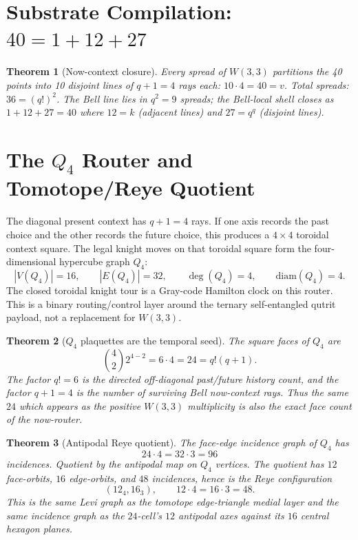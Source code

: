 \documentclass[11pt]{article}
\newtheorem{theorem}{Theorem}
\begin{document}
\section{Substrate Compilation: $40 = 1 + 12 + 27$}

\begin{theorem}[Now-context closure]\label{thm:nowclosure}
Every spread of $W(3,3)$ partitions the 40 points into 10 disjoint lines
of $q+1=4$ rays each: $10\cdot 4 = 40 = v$.  Total spreads: $36 = (q!)^2$.
The Bell line lies in $q^2 = 9$ spreads; the Bell-local shell closes as
$1 + 12 + 27 = 40$ where $12 = k$ (adjacent lines) and $27 = q^q$
(disjoint lines).
\end{theorem}

\section{The $Q_4$ Router and Tomotope/Reye Quotient}

The diagonal present context has $q+1=4$ rays.  If one axis records the
past choice and the other records the future choice, this produces a
$4\times4$ toroidal context square.  The legal knight moves on that
toroidal square form the four-dimensional hypercube graph $Q_4$:
\[
  |V(Q_4)|=16,\qquad |E(Q_4)|=32,\qquad \deg(Q_4)=4,\qquad \mathrm{diam}(Q_4)=4.
\]
The closed toroidal knight tour is a Gray-code Hamilton clock on this
router.  This is a binary routing/control layer around the ternary
self-entangled qutrit payload, not a replacement for $W(3,3)$.

\begin{theorem}[$Q_4$ plaquettes are the temporal seed]\label{thm:q4_seed}
The square faces of $Q_4$ are
\[
  \binom{4}{2}2^{4-2}=6\cdot4=24=q!(q+1).
\]
The factor $q!=6$ is the directed off-diagonal past/future history count,
and the factor $q+1=4$ is the number of surviving Bell now-context rays.
Thus the same $24$ which appears as the positive $W(3,3)$ multiplicity
is also the exact face count of the now-router.
\end{theorem}

\begin{theorem}[Antipodal Reye quotient]\label{thm:q4_reye}
The face-edge incidence graph of $Q_4$ has
\[
  24\cdot4=32\cdot3=96
\]
incidences.  Quotient by the antipodal map on $Q_4$ vertices.  The
quotient has $12$ face-orbits, $16$ edge-orbits, and $48$ incidences,
hence is the Reye configuration
\[
  (12_4,16_3),\qquad 12\cdot4=16\cdot3=48.
\]
This is the same Levi graph as the tomotope edge-triangle medial layer
and the same incidence graph as the $24$-cell's $12$ antipodal axes
against its $16$ central hexagon planes.
\end{theorem}
\end{document}
